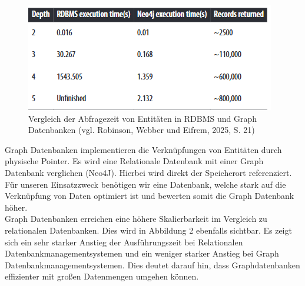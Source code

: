 \begin{figure}[H]
\centering
\includegraphics[scale=.6]{dateien/table.png}
\captionsetup{font=small, labelfont=bf, justification=centering}
\caption{Vergleich der Abfragezeit von Entitäten in RDBMS und Graph Datenbanken (vgl. Robinson, Webber und Eifrem, 2025, S. 21)}
\label{fig:meine-grafik}
\end{figure}
Graph Datenbanken implementieren die Verknüpfungen von Entitäten durch physische Pointer. Es wird eine Relationale Datenbank mit einer Graph Datenbank verglichen (Neo4J). Hierbei wird direkt der Speicherort referenziert. Für unseren Einsatzzweck benötigen wir eine Datenbank, welche stark auf die Verknüpfung von Daten optimiert ist und bewerten somit die Graph Datenbank höher.\\
Graph Datenbanken erreichen eine höhere Skalierbarkeit im Vergleich zu relationalen Datenbanken. Dies wird in Abbildung 2 ebenfalls sichtbar. Es zeigt sich ein sehr starker Anstieg der Ausführungszeit bei Relationalen Datenbankmanagementsystemen und ein weniger starker Anstieg bei Graph Datenbankmanagementsystemen. Dies deutet darauf hin, dass Graphdatenbanken effizienter mit großen Datenmengen umgehen können.
